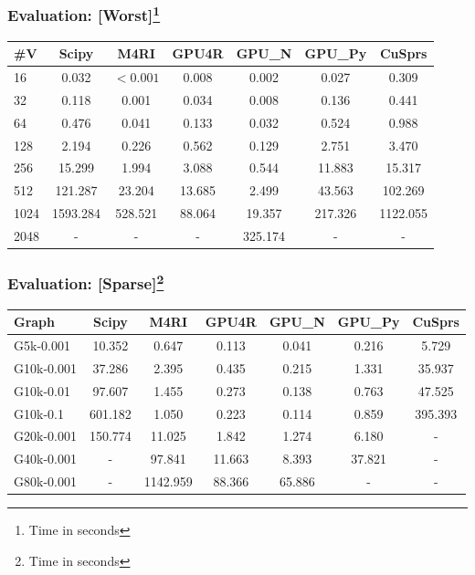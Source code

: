 \documentclass[xcolor=table]{beamer}
\begin{document}
\begin{frame} \frametitle{Evaluation: [Worst]\footnote{Time in seconds}}
  \begin{centering}
  \begin{tabular}{| l | c | c | c | c | c | c | }
      \hline
      \#V  & Scipy    & M4RI    & GPU4R  & GPU\_N  & GPU\_Py & CuSprs   \\
      \hline
      \hline
      16   & 0.032    & $< 0.001$    & 0.008  & 0.002   & 0.027   & 0.309    \\
      32   & 0.118    & 0.001   & 0.034  & 0.008   & 0.136   & 0.441    \\
      64   & 0.476    & 0.041   & 0.133  & 0.032   & 0.524   & 0.988    \\
      128  & 2.194    & 0.226   & 0.562  & 0.129   & 2.751   & 3.470    \\
      256  & 15.299   & 1.994   & 3.088  & 0.544   & 11.883  & 15.317   \\
      512  & 121.287  & 23.204  & 13.685 & 2.499   & 43.563  & 102.269  \\
      1024 & 1593.284 & 528.521 & 88.064 & 19.357  & 217.326 & 1122.055 \\
      2048 & -        & -       & -      & 325.174 & -       & -        \\
      \hline
    \end{tabular}
  \end{centering}
\end{frame}

\begin{frame} \frametitle{Evaluation: [Sparse]\footnote{Time in seconds}}

{\small
  \begin{tabular}{| l | c | c | c | c | c | c | }
      \hline
      Graph              & Scipy   & M4RI     & GPU4R  & GPU\_N & GPU\_Py & CuSprs  \\
      \hline
      \hline
      \small{G5k-0.001}  & 10.352  & 0.647    & 0.113  & 0.041  & 0.216   & 5.729   \\
      \small{G10k-0.001} & 37.286  & 2.395    & 0.435  & 0.215  & 1.331   & 35.937  \\
      \small{G10k-0.01}  & 97.607  & 1.455    & 0.273  & 0.138  & 0.763   & 47.525  \\
      \small{G10k-0.1}   & 601.182 & 1.050    & 0.223  & 0.114  & 0.859   & 395.393 \\
      \small{G20k-0.001} & 150.774 & 11.025   & 1.842  & 1.274  & 6.180   & -       \\
      \small{G40k-0.001} & -       & 97.841   & 11.663 & 8.393  & 37.821  & -       \\
      \small{G80k-0.001} & -       & 1142.959 & 88.366 & 65.886 & -       & -       \\
      \hline
    \end{tabular}
}
\end{frame}
\end{document}
